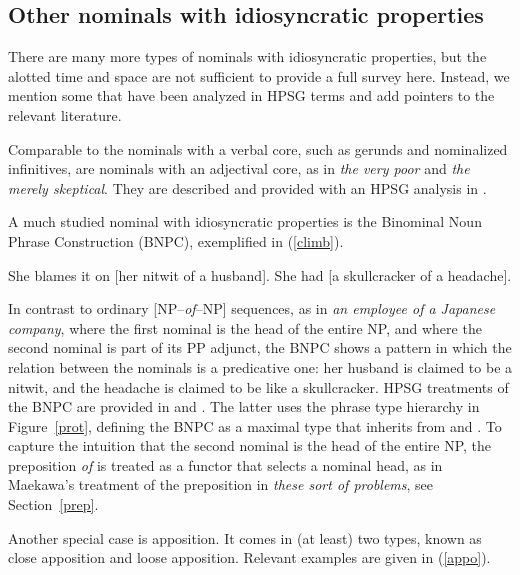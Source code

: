 \documentclass[output=paper
                ,modfonts
                ,nonflat
	        ,collection
	        ,collectionchapter
	        ,collectiontoclongg
 	        ,biblatex
                ,babelshorthands
                ,newtxmath
                ,draftmode
                ,colorlinks, citecolor=brown
]{./langsci/langscibook}
\begin{document}
\subsection{Other nominals with idiosyncratic properties} 
\label{other}


There are many more types of nominals with idiosyncratic properties,
but the alotted time and space are not sufficient to provide a full survey here. 
Instead, we mention some that have been analyzed in HPSG terms and add pointers 
to the relevant literature.    

Comparable to the nominals with a verbal core, such as gerunds and nominalized 
infinitives, are nominals with an adjectival core, as in \emph{the very poor} and 
\emph{the merely skeptical}. They are described and provided with an HPSG analysis 
in \citet{ArnoldSpencer2015}.

A much studied nominal with idiosyncratic properties is the Binominal Noun Phrase 
Construction (BNPC), exemplified in (\ref{climb}). 

\begin{exe}
\ex\label{climb}
\begin{xlist}
\ex  She blames it on [her nitwit of a husband]. 
\ex  She had [a skullcracker of a headache]. 
\end{xlist}
\end{exe}

\noindent
In contrast to ordinary [NP--\emph{of}--NP] sequences, 
as in \emph{an employee of a Japanese company}, where the 
first nominal is the head of the entire NP, and where the second 
nominal is part of its PP adjunct, the BNPC shows a pattern
in which the relation between the nominals is a predicative one: 
her husband is claimed to be a nitwit, and the headache is claimed to be 
like a skullcracker. HPSG treatments of the BNPC are provided in
\citet{KimSells14} and \citet{VanEynde18}. The latter uses 
the phrase type hierarchy in Figure~\ref{prot}, defining the BNPC as 
a maximal type that inherits from  and 
. To capture the intuition that the second
nominal is the head of the entire NP, the preposition \emph{of} is 
treated as a functor that selects a nominal head, as in Maekawa's treatment of 
the preposition in \emph{these sort of problems}, see Section~\ref{prep}. 

Another special case is apposition. It comes in (at least) two types, known as 
close apposition and loose apposition. Relevant examples are given in (\ref{appo}). 
\end{document}
